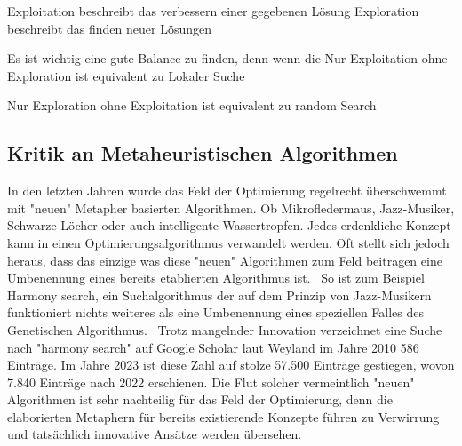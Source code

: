 Exploitation beschreibt das verbessern einer gegebenen Lösung
Exploration beschreibt das finden neuer Lösungen

Es ist wichtig eine gute Balance zu finden, denn wenn die 
Nur Exploitation ohne Exploration ist equivalent zu Lokaler Suche

Nur Exploration ohne Exploitation ist equivalent zu random Search

\subsection{Kritik an Metaheuristischen Algorithmen}
In den letzten Jahren wurde das Feld der Optimierung regelrecht überschwemmt mit 
"neuen" Metapher basierten Algorithmen. Ob Mikrofledermaus, Jazz-Musiker, Schwarze Löcher
oder auch intelligente Wassertropfen. Jedes erdenkliche Konzept kann in einen 
Optimierungsalgorithmus verwandelt werden.
Oft stellt sich jedoch heraus, dass das einzige was diese "neuen" Algorithmen zum Feld beitragen
eine Umbenennung eines bereits etablierten Algorithmus ist.~\cite*{NoNovelty}
So ist zum Beispiel Harmony search, ein Suchalgorithmus der auf dem Prinzip von 
Jazz-Musikern funktioniert nichts weiteres als eine Umbenennung eines 
speziellen Falles des Genetischen Algorithmus.~\cite*{HarmonySearch}
Trotz mangelnder Innovation verzeichnet eine Suche nach "harmony search"
auf Google Scholar laut Weyland im Jahre 2010 586 Einträge. Im Jahre 2023 ist diese Zahl 
auf stolze 57.500 Einträge gestiegen, wovon 7.840 Einträge nach 2022 erschienen.
Die Flut solcher vermeintlich "neuen" Algorithmen ist sehr nachteilig für das 
Feld der Optimierung, denn die elaborierten Metaphern für bereits existierende Konzepte 
führen zu Verwirrung und tatsächlich innovative Ansätze werden übersehen.~\cite*{MetaheuristicsExposed}